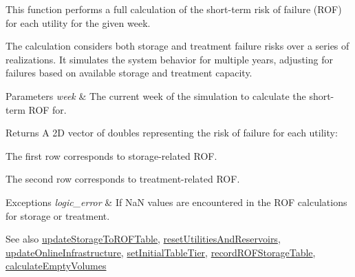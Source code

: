 This function performs a full calculation of the short-\/term risk of failure (R\+OF) for each utility for the given week. 

The calculation considers both storage and treatment failure risks over a series of realizations. It simulates the system behavior for multiple years, adjusting for failures based on available storage and treatment capacity.


\begin{DoxyParams}{Parameters}
{\em week} & The current week of the simulation to calculate the short-\/term R\+OF for.\\
\hline
\end{DoxyParams}
\begin{DoxyReturn}{Returns}
A 2D vector of doubles representing the risk of failure for each utility\+:
\begin{DoxyItemize}
\item The first row corresponds to storage-\/related R\+OF.
\item The second row corresponds to treatment-\/related R\+OF.
\end{DoxyItemize}
\end{DoxyReturn}

\begin{DoxyExceptions}{Exceptions}
{\em logic\+\_\+error} & If NaN values are encountered in the R\+OF calculations for storage or treatment.\\
\hline
\end{DoxyExceptions}
\begin{DoxySeeAlso}{See also}
\mbox{\hyperlink{classContinuityModelROF_a28834584763c3aa27a6f0917aa68926f}{update\+Storage\+To\+R\+O\+F\+Table}}, \mbox{\hyperlink{classContinuityModelROF_acd72d71a29cef49c4de3d111378b76c7}{reset\+Utilities\+And\+Reservoirs}}, \mbox{\hyperlink{classContinuityModelROF_a06cf47a32d6793b0ee912deccf92fc5b}{update\+Online\+Infrastructure}}, \mbox{\hyperlink{classContinuityModelROF_a0c46d5905f5d0ae2cf0abd0d4653bbc7}{set\+Initial\+Table\+Tier}}, \mbox{\hyperlink{classContinuityModelROF_aa2348a2a5dea751462771ef538243e75}{record\+R\+O\+F\+Storage\+Table}}, \mbox{\hyperlink{classContinuityModelROF_aa720006d12410fc35b8768eda716c149}{calculate\+Empty\+Volumes}} 
\end{DoxySeeAlso}
\mbox{\label{classContinuityModelROF_a48b31e060f1d75e31fa591015f4a1c22}} 
